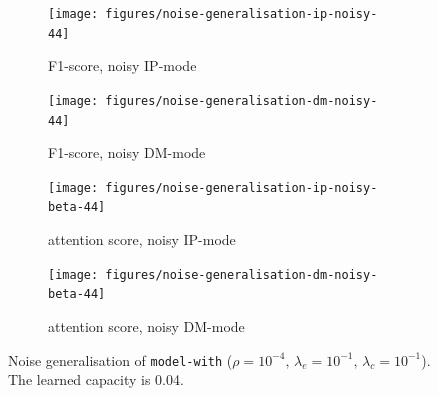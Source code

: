 \begin{figure}[!h]
\centering
\begin{subfigure}{.5\textwidth}
  \centering
  \texttt{[image: figures/noise-generalisation-ip-noisy-44]}
  \caption{F1-score, noisy IP-mode}
\end{subfigure}%
\begin{subfigure}{.5\textwidth}
  \centering
  \texttt{[image: figures/noise-generalisation-dm-noisy-44]}
  \caption{F1-score, noisy DM-mode}
\end{subfigure}
\begin{subfigure}{.5\textwidth}
  \centering
  \texttt{[image: figures/noise-generalisation-ip-noisy-beta-44]}
  \caption{attention score, noisy IP-mode}
\end{subfigure}%
\begin{subfigure}{.5\textwidth}
  \centering
  \texttt{[image: figures/noise-generalisation-dm-noisy-beta-44]}
  \caption{attention score, noisy DM-mode}
\end{subfigure}
\caption[Noise generalisation with not enough capacity]{Noise generalisation of \texttt{model-with} ($\rho=10^{-4},\,\lambda_e=10^{-1},\,\lambda_c=10^{-1}$). The learned capacity is 0.04.}
\label{fig:exp-att-shift-8}
\end{figure}